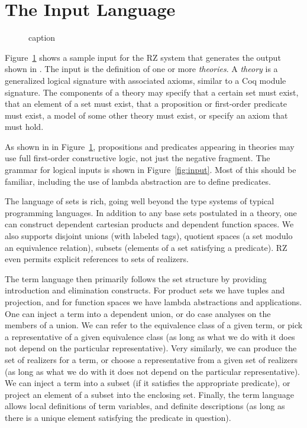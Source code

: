 \section{The Input Language}
\label{sec:input-language}

\begin{figure}[htbp]
	\caption{caption}
	\label{fig:typicalinput}
\end{figure}

Figure~\ref{fig:typicalinput} shows a sample input for the RZ system that
generates the output shown in . The input is the
definition of one or more \emph{theories}. A \emph{theory} is a generalized
logical signature with associated axioms, similar to a Coq module signature.
The components of a theory may specify that a certain set must exist, that an
element of a set must exist, that a proposition or first-order predicate must
exist, a model of some other theory must exist, or specify an axiom that must
hold.


As shown in in Figure~\ref{fig:typicalinput}, propositions and predicates
appearing in theories may use full first-order constructive logic, not just the
negative fragment. The grammar for logical inputs is shown in
Figure~\ref{fig:input}. Most of this should be familiar, including the use of
lambda abstraction are to define predicates.

The language of sets is rich, going well beyond the type systems of typical
programming languages. In addition to any base sets postulated in a theory, one
can construct dependent cartesian products and dependent function spaces. We
also supports disjoint unions (with labeled tags), quotient spaces (a set
modulo an equivalence relation), subsets (elements of a set satisfying a
predicate). RZ even permits explicit references to sets of realizers.

The term language then primarily follows the set structure by providing
introduction and elimination constructs. For product sets we have tuples and
projection, and for function spaces we have lambda abstractions and
applications. One can inject a term into a dependent union, or do case analyses
on the members of a union. We can refer to the equivalence class of a given
term, or pick a representative of a given equivalence class (as long as what we
do with it does not depend on the particular representative). Very similarly,
we can produce the set of realizers for a term, or choose a representative from
a given set of realizers (as long as what we do with it does not depend on the
particular representative). We can inject a term into a subset (if it satisfies
the appropriate predicate), or project an element of a subset into the
enclosing set. Finally, the term language allows local definitions of term
variables, and definite descriptions (as long as there is a unique element
satisfying the predicate in question).


